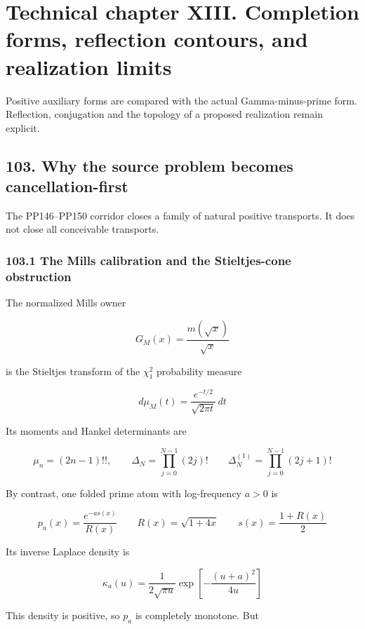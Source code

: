 \documentclass[
  11pt,
]{book}
\begin{document}

\chapter{Technical chapter XIII. Completion forms, reflection contours,
and realization
limits}\label{technical-chapter-xiii.-completion-forms-reflection-contours-and-realization-limits}

Positive auxiliary forms are compared with the actual Gamma-minus-prime
form. Reflection, conjugation and the topology of a proposed realization
remain explicit.

\section{103. Why the source problem becomes
cancellation-first}\label{why-the-source-problem-becomes-cancellation-first}

The PP146--PP150 corridor closes a family of natural positive
transports. It does not close all conceivable transports.

\subsection{103.1 The Mills calibration and the Stieltjes-cone
obstruction}\label{the-mills-calibration-and-the-stieltjes-cone-obstruction}

The normalized Mills owner

\[
G_M(x)=\frac{m(\sqrt x)}{\sqrt x}
\]

is the Stieltjes transform of the \(\chi_1^2\) probability measure

\[
d\mu_M(t)=\frac{e^{-t/2}}{\sqrt{2\pi t}}\,dt
\tag{103.1}
\]

Its moments and Hankel determinants are

\[
\mu_n=(2n-1)!!,\qquad
\Delta_N=\prod_{j=0}^{N-1}(2j)!
\qquad
\Delta_N^{(1)}=\prod_{j=0}^{N-1}(2j+1)!
\tag{103.2}
\]

By contrast, one folded prime atom with log-frequency \(a>0\) is

\[
p_a(x)=\frac{e^{-a s(x)}}{R(x)}
\qquad
R(x)=\sqrt{1+4x}
\qquad
s(x)=\frac{1+R(x)}2
\tag{103.3}
\]

Its inverse Laplace density is

\[
\kappa_a(u)
=\frac1{2\sqrt{\pi u}}
\exp\!\left[-\frac{(u+a)^2}{4u}\right]
\tag{103.4}
\]

This density is positive, so \(p_a\) is completely monotone. But
\end{document}
